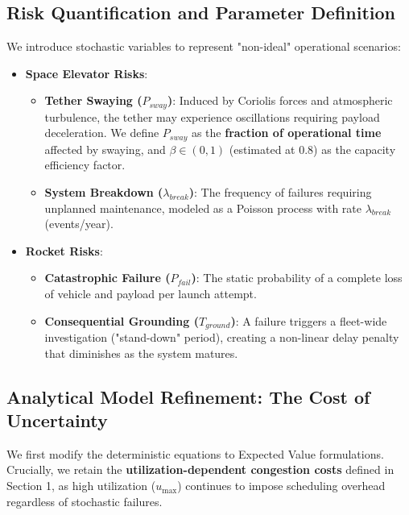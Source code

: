 \documentclass{mcmthesis}
\begin{document}
\subsection{Risk Quantification and Parameter Definition}
We introduce stochastic variables to represent "non-ideal" operational scenarios:

\begin{itemize}
    \item \textbf{Space Elevator Risks}:
    \begin{itemize}
        \item[(a)] \textbf{Tether Swaying ($P_{sway}$)}: Induced by Coriolis forces and atmospheric turbulence, the tether may experience oscillations requiring payload deceleration. We define $P_{sway}$ as the \textbf{fraction of operational time} affected by swaying, and $\beta \in (0, 1)$ (estimated at 0.8) as the capacity efficiency factor.
        \item[(b)] \textbf{System Breakdown ($\lambda_{break}$)}: The frequency of failures requiring unplanned maintenance, modeled as a Poisson process with rate $\lambda_{break}$ (events/year).
    \end{itemize}
    
    \item \textbf{Rocket Risks}:
    \begin{itemize}
        \item[(a)] \textbf{Catastrophic Failure ($P_{fail}$)}: The static probability of a complete loss of vehicle and payload per launch attempt.
        \item[(b)] \textbf{Consequential Grounding ($T_{ground}$)}: A failure triggers a fleet-wide investigation ("stand-down" period), creating a non-linear delay penalty that diminishes as the system matures.
    \end{itemize}
\end{itemize}

\subsection{Analytical Model Refinement: The Cost of Uncertainty}
We first modify the deterministic equations to Expected Value formulations. Crucially, we retain the \textbf{utilization-dependent congestion costs} defined in Section 1, as high utilization ($u_{\max}$) continues to impose scheduling overhead regardless of stochastic failures.
\end{document}
